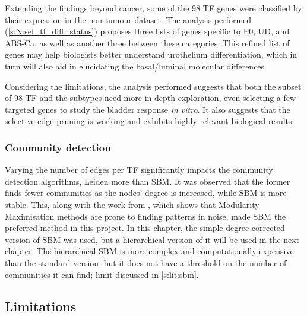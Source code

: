 Extending the findings beyond cancer, some of the 98 TF genes were classified by their expression in the non-tumour dataset. The analysis performed (\cref{s:N:sel_tf_diff_status}) proposes three lists of genes specific to P0, UD, and ABS-Ca, as well as another three between these categories. This refined list of genes may help biologists better understand urothelium differentiation, which in turn will also aid in elucidating the basal/luminal molecular differences.

Considering the limitations, the analysis performed suggests that both the subset of 98 TF and the subtypes need more in-depth exploration, even selecting a few targeted genes to study the bladder response \textit{in vitro}. It also suggests that the selective edge pruning is working and exhibits highly relevant biological results.

\subsubsection*{Community detection}

Varying the number of edges per TF significantly impacts the community detection algorithms, Leiden more than SBM. It was observed that the former finds fewer communities as the nodes' degree is increased, while SBM is more stable. This, along with the work from \citet{Peixoto2023-se, Peixoto2023-rt}, which shows that Modularity Maximisation methods are prone to finding patterns in noise, made SBM the preferred method in this project. In this chapter, the simple degree-corrected version of SBM was used, but a hierarchical version of it will be used in the next chapter. The hierarchical SBM is more complex and computationally expensive than the standard version, but it does not have a threshold on the number of communities it can find; limit discussed in \cref{s:lit:sbm}.


\subsection* {Limitations}

